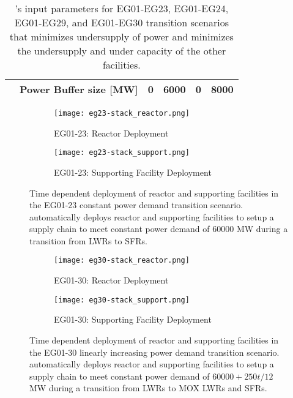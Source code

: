 \begin{table}[]
{\begin{tabular}{l|l|c|l|l|l}
											  & Power Buffer size [MW]                                                   & 0 & 6000 & 0 & 8000 \\ \hline
	\end{tabular}%
	}
	\caption{\deploy's input parameters for EG01-EG23, EG01-EG24, EG01-EG29, and 
	EG01-EG30 transition scenarios
	that minimizes undersupply of power and minimizes 
	the undersupply and under capacity of the other facilities. }
	\label{tab:bestinputs}
	\end{table}

\begin{figure}[]
	\centering
	\begin{subfigure}[t]{1.2\textwidth}
		\centering
		\texttt{[image: eg23-stack\_reactor.png]} 
		\caption{EG01-23: Reactor Deployment}
		\label{fig:23reactor}
	\end{subfigure}
	\vspace{1cm}
	\begin{subfigure}[t]{1.2\textwidth}
		\centering
		\texttt{[image: eg23-stack\_support.png]} 
		\caption{EG01-23: Supporting Facility Deployment}
		\label{fig:23support}
	\end{subfigure}
	\hfill
	\caption{Time dependent deployment of reactor and supporting facilities in 
	the EG01-23 constant power demand transition scenario. 
	\deploy automatically deploys reactor and supporting facilities 
	to setup a supply chain to meet constant power demand of $60000$ MW
	during a transition from \glspl{LWR} to \glspl{SFR}. }
	\label{fig:23stack}
\end{figure}

\begin{figure}[]
	\centering
	\begin{subfigure}[t]{1.2\textwidth}
		\centering
		\texttt{[image: eg30-stack\_reactor.png]} 
		\caption{EG01-30: Reactor Deployment}
		\label{fig:30reactor}
	\end{subfigure}
	\vspace{1cm}
	\begin{subfigure}[t]{1.2\textwidth}
		\centering
		\texttt{[image: eg30-stack\_support.png]} 
		\caption{EG01-30: Supporting Facility Deployment}
		\label{fig:30support}
	\end{subfigure}
	\hfill
	\caption{Time dependent deployment of reactor and supporting facilities in 
	the EG01-30 linearly increasing power demand transition scenario. 
	\deploy automatically deploys reactor and supporting facilities 
	to setup a supply chain to meet constant power demand of $60000 + 250t/12$ MW
	during a transition from \glspl{LWR} to MOX LWRs and \glspl{SFR}. }
	\label{fig:30stack}
\end{figure}

